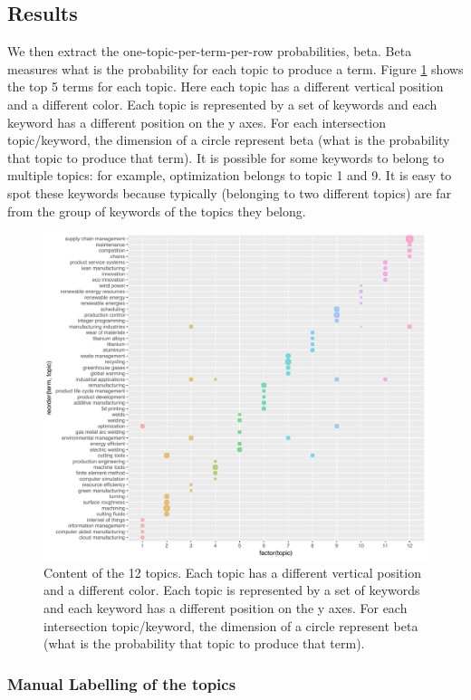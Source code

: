 \documentclass[]{book}
\begin{document}
\subsection{Results}\label{results-4}

We then extract the one-topic-per-term-per-row probabilities, beta. Beta
measures what is the probability for each topic to produce a term.
Figure \ref{fig:topicpicture} shows the top 5 terms for each topic. Here
each topic has a different vertical position and a different color. Each
topic is represented by a set of keywords and each keyword has a
different position on the y axes. For each intersection topic/keyword,
the dimension of a circle represent beta (what is the probability that
topic to produce that term). It is possible for some keywords to belong
to multiple topics: for example, optimization belongs to topic 1 and 9.
It is easy to spot these keywords because typically (belonging to two
different topics) are far from the group of keywords of the topics they
belong.

\begin{figure}

{\centering \includegraphics[width=0.6\linewidth]{_bookdown_files/figures/geom_point_topic} 

}

\caption{Content of the 12 topics. Each topic has a different vertical position and a different color. Each topic is represented by a set of keywords and each keyword has a different position on the y axes. For each intersection topic/keyword, the dimension of a circle represent beta (what is the probability that topic to produce that term).}\label{fig:topicpicture}
\end{figure}

\subsubsection*{Manual Labelling of the
topics}\label{manual-labelling-of-the-topics}
\end{document}
